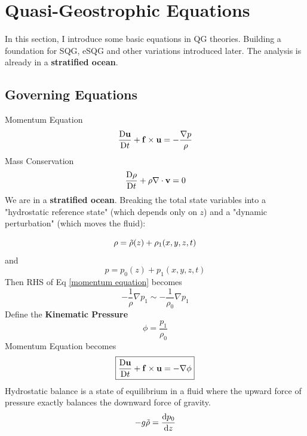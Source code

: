 \documentclass[../SQG_notes.tex]{subfiles}
\begin{document}
    \section{Quasi-Geostrophic Equations}
    In this section, I introduce some basic equations in QG theories. Building a foundation for SQG, eSQG and other variations introduced later. The analysis is already in a \textbf{stratified ocean}. 
    \subsection{Governing Equations}
    Momentum Equation
    \begin{equation}
        \frac{\mathrm{D} \mathbf{u}}{\mathrm{D} t} + \mathbf{f} \times \mathbf{u} = -\frac{\nabla p}{\rho} \label{momentum equation}
    \end{equation}
    Mass Conservation 
    \begin{equation}
        \frac{\mathrm{D} \rho}{\mathrm{D} t} + \rho \nabla \cdot \mathbf{v} = 0
    \end{equation}
    We are in a \textbf{stratified ocean}. Breaking the total state variables into a "hydrostatic reference state" (which depends only on $z$) and a "dynamic perturbation" (which moves the fluid): 
    
    \begin{equation}
        \rho = \tilde{\rho}(z) + \rho_1(x,y,z,t) \label{stratified density}
    \end{equation}
    and 
    \begin{equation}
        p = p_0(z) + p_1(x,y,z,t) \label{stratifies pressure}
    \end{equation}
    Then RHS of Eq \ref{momentum equation} becomes 
    \[ -\frac{1}{\rho} \nabla p_1 \sim -\frac{1}{\rho_0}\nabla p_1\]
    Define the \textbf{Kinematic Pressure}
    \begin{equation}
        \phi = \frac{p_1}{\rho_0}
    \end{equation}
    Momentum Equation becomes 
    \begin{equation}
        \boxed{\frac{\mathrm{D} \mathbf{u}}{\mathrm{D} t}+\mathbf{f} \times \mathbf{u} = -\nabla \phi} \label{momentum equation2}
    \end{equation}
    Hydrostatic balance is a state of equilibrium in a fluid where the upward force of pressure exactly balances the downward force of gravity.
    \begin{equation}
        -g\tilde{\rho} = \frac{\mathrm{d} p_0}{\mathrm{d} z} \label{hydrostatic balance}
    \end{equation}
\end{document}
